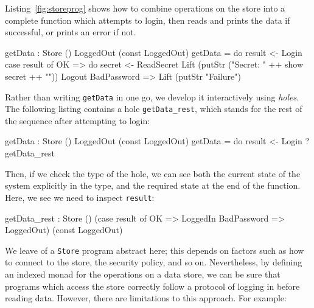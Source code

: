 \label{sect:getdata}

Listing~\ref{fig:storeprog} shows how to combine operations on the store into a
complete function which attempts to login, then reads and prints the data if
successful, or prints an error if not.

\small
\begin{code}[float=h, frame=single,caption={A function which logs in to the
store and reads the secret data if login succeeds},label=fig:storeprog]
getData : Store () LoggedOut (const LoggedOut)
getData = do result <- Login
             case result of
                  OK => do secret <- ReadSecret
                           Lift (putStr ("Secret: " ++ show secret ++ "\n"))
                           Logout
                  BadPassword => Lift (putStr "Failure\n")
\end{code}
\normalsize

Rather than writing \texttt{getData} in one go, we develop it interactively
using \emph{holes}. The following listing contains a hole
\texttt{getData\_rest}, which stands for the rest of the sequence after
attempting to login:

\small
\begin{code}
getData : Store () LoggedOut (const LoggedOut)
getData = do result <- Login
             ?getData_rest
\end{code}
\normalsize

Then, if we check the type of the hole, we can see both the current state of
the system explicitly in the type, and the required state at the end of the
function. Here, we see we need to inspect \texttt{result}:

\small
\begin{code}
getData_rest : Store () (case result of
                              OK => LoggedIn
                              BadPassword => LoggedOut) (const LoggedOut)
\end{code}
\normalsize


We leave  of a \texttt{Store} program abstract here;
this depends on factors such as how to connect to the store, the security
policy, and so on.
Nevertheless, by defining an indexed monad for the operations on a data store,
we can be sure that programs which access the store correctly follow a protocol
of logging in before reading data. However, there are limitations to this
approach. For example:

